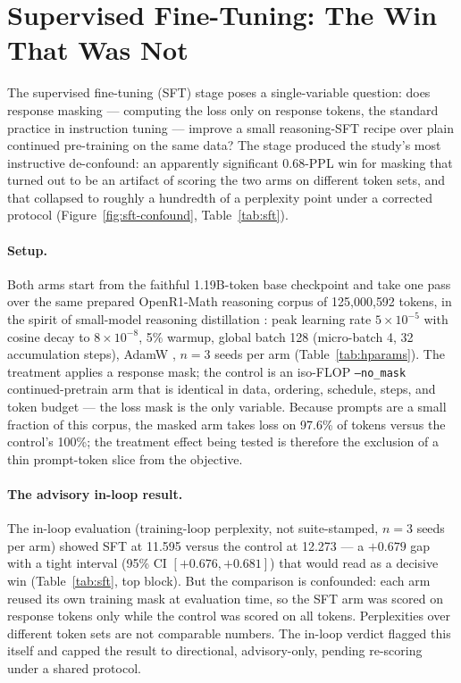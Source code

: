 \section{Supervised Fine-Tuning: The Win That Was Not}\label{sec:sft}

The supervised fine-tuning (SFT) stage poses a single-variable question: does
response masking --- computing the loss only on response tokens, the standard
practice in instruction tuning --- improve a small reasoning-SFT recipe over
plain continued pre-training on the same data? The stage produced the study's
most instructive de-confound: an apparently significant 0.68-PPL win for
masking that turned out to be an artifact of scoring the two arms on different
token sets, and that collapsed to roughly a hundredth of a perplexity point
under a corrected protocol (Figure~\ref{fig:sft-confound},
Table~\ref{tab:sft}).

\paragraph{Setup.}
Both arms start from the faithful 1.19B-token base checkpoint and take one
pass over the same prepared OpenR1-Math reasoning corpus of 125{,}000{,}592
tokens, in the spirit of small-model reasoning distillation
\citep{xu2026vibethinker}: peak learning rate $5\times10^{-5}$ with cosine
decay to $8\times10^{-8}$, 5\% warmup, global batch 128 (micro-batch 4, 32
accumulation steps), AdamW \citep{loshchilov2017decoupled}, $n{=}3$ seeds per
arm (Table~\ref{tab:hparams}). The treatment applies a response mask; the
control is an iso-FLOP \texttt{--no\_mask} continued-pretrain arm that is
identical in data, ordering, schedule, steps, and token budget --- the loss
mask is the only variable. Because prompts are a small fraction of this
corpus, the masked arm takes loss on 97.6\% of tokens versus the control's
100\%; the treatment effect being tested is therefore the exclusion of a thin
prompt-token slice from the objective.

\paragraph{The advisory in-loop result.}
The in-loop evaluation (training-loop perplexity, not suite-stamped, $n{=}3$
seeds per arm) showed SFT at 11.595 versus the control at 12.273 --- a
$+0.679$ gap with a tight interval (95\% CI $[+0.676, +0.681]$) that would
read as a decisive win (Table~\ref{tab:sft}, top block). But the comparison is
confounded: each arm reused its own training mask at evaluation time, so the
SFT arm was scored on response tokens only while the control was scored on all
tokens. Perplexities over different token sets are not comparable numbers. The
in-loop verdict flagged this itself and capped the result to directional,
advisory-only, pending re-scoring under a shared protocol.

